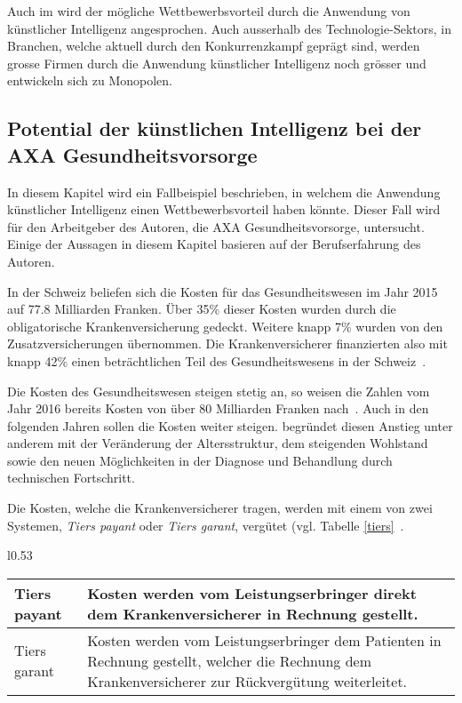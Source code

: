 Auch im \textcite{TheEconomist2018} wird der mögliche Wettbewerbsvorteil durch die Anwendung von künstlicher Intelligenz angesprochen. Auch ausserhalb des Technologie-Sektors, in Branchen, welche aktuell durch den Konkurrenzkampf geprägt sind, werden grosse Firmen durch die Anwendung künstlicher Intelligenz noch grösser und entwickeln sich zu Monopolen.

\subsection{Potential der künstlichen Intelligenz bei der AXA Gesundheitsvorsorge}

In diesem Kapitel wird ein Fallbeispiel beschrieben, in welchem die Anwendung künstlicher Intelligenz einen Wettbewerbsvorteil haben könnte. Dieser Fall wird für den Arbeitgeber des Autoren, die AXA Gesundheitsvorsorge, untersucht. Einige der Aussagen in diesem Kapitel basieren auf der Berufserfahrung des Autoren.

In der Schweiz beliefen sich die Kosten für das Gesundheitswesen im Jahr 2015 auf 77.8 Milliarden Franken. Über 35\% dieser Kosten wurden durch die obligatorische Krankenversicherung gedeckt. Weitere knapp 7\% wurden von den Zusatzversicherungen übernommen. Die Krankenversicherer finanzierten also mit knapp 42\% einen beträchtlichen Teil des Gesundheitswesens in der Schweiz~\autocite{BfS2018}.

Die Kosten des Gesundheitswesen steigen stetig an, so weisen die Zahlen vom Jahr 2016 bereits Kosten von über 80 Milliarden Franken nach~\autocite{BfS2018}. Auch in den folgenden Jahren sollen die Kosten weiter steigen. \textcite{Kirchgassner2009} begründet diesen Anstieg unter anderem mit der Veränderung der Altersstruktur, dem steigenden Wohlstand sowie den neuen Möglichkeiten in der Diagnose und Behandlung durch technischen Fortschritt.

Die Kosten, welche die Krankenversicherer tragen, werden mit einem von zwei Systemen, \textit{Tiers payant} oder \textit{Tiers garant}, vergütet (vgl. Tabelle \ref{tiers}~\autocite{EDI2017}. 

\begin{wraptable}{l}{0.53\textwidth}
    \renewcommand{\arraystretch}{1.25}
    \setlength{\tabcolsep}{5pt}
    \caption{Vergütungsmodelle bei den schweizer Krankenversicherern}
    \label{tiers}
    \begin{tabular}{| p{} | p{} |}
        \hline
         Tiers payant & Kosten werden vom Leistungserbringer direkt dem Krankenversicherer in Rechnung gestellt. \\
        \hline
         Tiers garant & Kosten werden vom Leistungserbringer dem Patienten in Rechnung gestellt, welcher die Rechnung dem Krankenversicherer zur Rückvergütung weiterleitet. \\
        \hline
    \end{tabular}
\end{wraptable}

